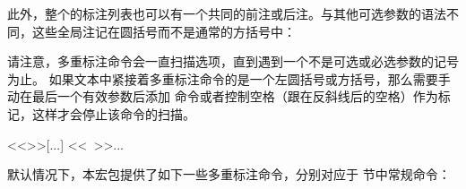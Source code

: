 \begin{ltxexample}
\parencites[35]{key1}[chapter 2 in][]{key2}[23]{key3}
\end{ltxexample}
%
此外，整个的标注列表也可以有一个共同的前注或后注。与其他可选参数的语法不同，这些全局注记在圆括号而不是通常的方括号中：

%
请注意，多重标注命令会一直扫描选项，直到遇到一个不是可选或必选参数的记号为止。
如果文本中紧接着多重标注命令的是一个左圆括号或方括号，那么需要手动在最后一个有效参数后添加  命令或者控制空格（跟在反斜线后的空格）作为标记，这样才会停止该命令的扫描。

\begin{ltxexample}[style=latex,showspaces]{}
\parencites[35]{key1}[78]{key2}<<\relax>>[...]
\parencites[35]{key1}[78]{key2}<<\ >>{...}
\end{ltxexample}
%
默认情况下，本宏包提供了如下一些多重标注命令，分别对应于  节中常规命令：

